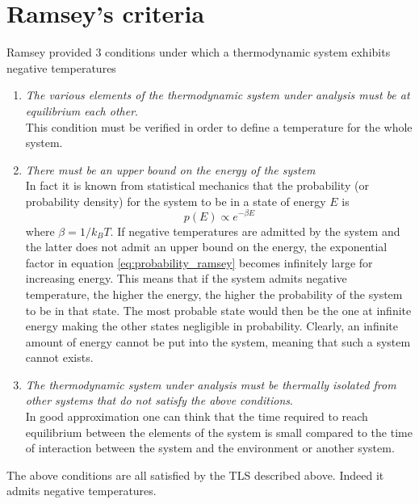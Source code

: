 \section{Ramsey's criteria}
Ramsey \cite{Ramsey} provided 3 conditions under which a thermodynamic system exhibits negative temperatures
\begin{enumerate}
    \item \emph{The various elements of the thermodynamic system under analysis must be at equilibrium each other}. \\
    This condition must be verified in order to define a temperature for the whole system.
    \item \emph{There must be an upper bound on the energy of the system} \\
    In fact it is known from statistical mechanics that the probability (or probability density) for the system to be in a state of energy $E$ is 
    \begin{equation}
        p(E) \propto e^{-\beta E}
        \label{eq:probability_ramsey}
    \end{equation}
    where $\beta = 1/k_BT$. If negative temperatures are admitted by the system and the latter does not admit an upper bound on the energy, the exponential factor in equation \ref{eq:probability_ramsey}
    becomes infinitely large for increasing energy. This means that if the system admits negative temperature, the higher the energy, the higher the probability of the system to be in that state. The most probable state 
    would then be the one at infinite energy making the other states negligible in probability. Clearly, an infinite amount of energy cannot be put into the system, meaning that such a system cannot exists.
    \item \emph{The thermodynamic system under analysis must be thermally isolated from other systems that do not satisfy the above conditions}. \\
    In good approximation one can think that the time required to reach equilibrium between the elements of the system is small compared to the time of interaction
    between the system and the environment or another system.
\end{enumerate}
The above conditions are all satisfied by the TLS described above. Indeed it admits negative temperatures. \\